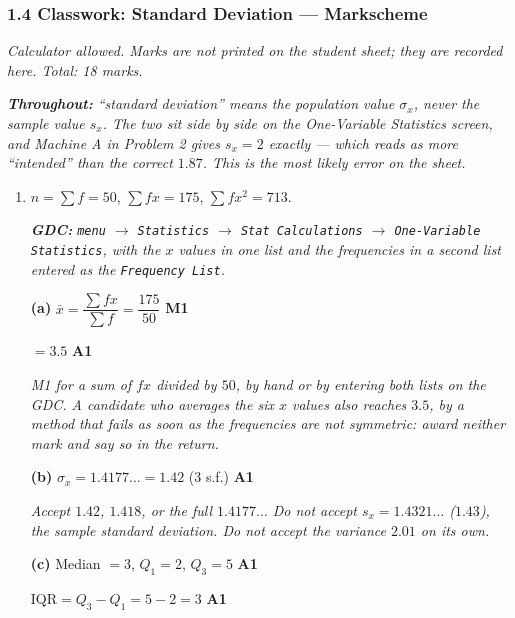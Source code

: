 \documentclass[12pt, twoside]{article}
\begin{document}
\subsubsection*{1.4 Classwork: Standard Deviation --- Markscheme}

\emph{Calculator allowed. Marks are not printed on the student sheet; they are
recorded here. Total: 18 marks.}

\emph{\textbf{Throughout:} ``standard deviation'' means the population value
$\sigma_{x}$, never the sample value $s_{x}$. The two sit side by side on the
One-Variable Statistics screen, and Machine A in Problem 2 gives $s_{x} = 2$
exactly --- which reads as more ``intended'' than the correct $1.87$. This is
the most likely error on the sheet.}

\begin{enumerate}[itemsep=0.3cm]

\item[1.] [Maximum mark: 9]

$n = \sum f = 50$, \quad $\sum fx = 175$, \quad $\sum fx^{2} = 713$.

\emph{\textbf{GDC:} \texttt{menu} $\rightarrow$ \texttt{Statistics}
$\rightarrow$ \texttt{Stat Calculations} $\rightarrow$ \texttt{One-Variable
Statistics}, with the $x$ values in one list and the frequencies in a second
list entered as the \texttt{Frequency List}.}

\textbf{(a)} $\bar{x} = \dfrac{\sum fx}{\sum f} = \dfrac{175}{50}$
\hfill \textbf{M1}

$= 3.5$ \hfill \textbf{A1}

\emph{M1 for a sum of $fx$ divided by $50$, by hand or by entering both lists
on the GDC. A candidate who averages the six $x$ values also reaches $3.5$, by
a method that fails as soon as the frequencies are not symmetric: award neither
mark and say so in the return.}

\textbf{(b)} $\sigma_{x} = 1.4177\ldots = 1.42$ (3 s.f.) \hfill \textbf{A1}

\emph{Accept $1.42$, $1.418$, or the full $1.4177\ldots$ Do not accept
$s_{x} = 1.4321\ldots$ ($1.43$), the sample standard deviation. Do not accept
the variance $2.01$ on its own.}

\textbf{(c)} Median $= 3$, \quad $Q_{1} = 2$, \quad $Q_{3} = 5$
\hfill \textbf{A1}

$\text{IQR} = Q_{3} - Q_{1} = 5 - 2 = 3$ \hfill \textbf{A1}


\end{enumerate}
\end{document}

